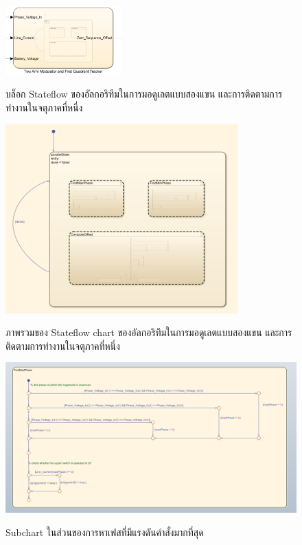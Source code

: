 \documentclass[11pt,a4paper]{article}
\begin{document}
\begin{figure}
    \centering
    \includegraphics[width=0.4\textwidth]{tam-fqt-l0.png}
    \label{tam-fqt-l0}
    \caption{บล็อก Stateflow ของอัลกอริทึมในการมอดูเลตแบบสองแขน และการติดตามการทำงานในจตุภาคที่หนึ่ง}
\end{figure}

\begin{figure}
    \centering
    \includegraphics[width=0.8\textwidth]{tam-fqt-l1.png}
    \label{tam-fqt-l1}
    \caption{ภาพรวมของ Stateflow chart ของอัลกอริทึมในการมอดูเลตแบบสองแขน และการติดตามการทำงานในจตุภาคที่หนึ่ง}
\end{figure}

\begin{figure}
    \centering
    \includegraphics[width=\textwidth]{tam-fqt-l2-1.png}
    \label{tam-fqt-l2-1}
    \caption{Subchart ในส่วนของการหาเฟสที่มีแรงดันคำสั่งมากที่สุด}
\end{figure}
\end{document}
